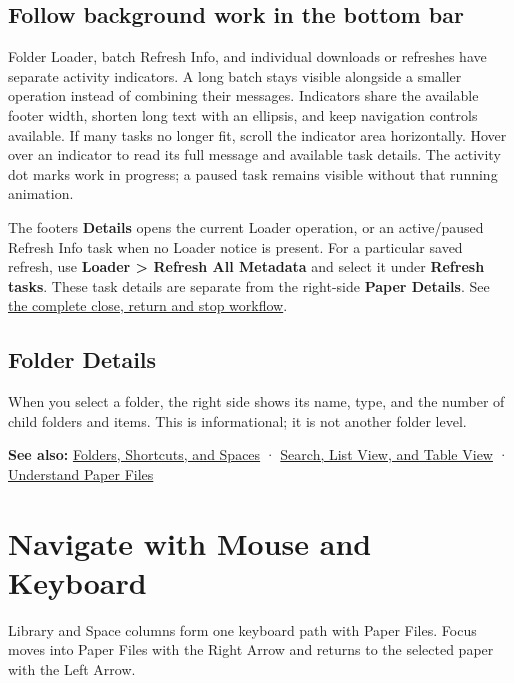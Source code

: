 \documentclass[10pt,letterpaper,oneside]{scrreprt}
\newenvironment{GewuRelated}{\par\nobreak\vspace{3pt}\nobreak\begingroup\small\sffamily\begin{samepage}\noindent}{\par\end{samepage}\endgroup}
\newenvironment{GewuLead}
  {\begin{list}{}{\leftmargin=0pt\rightmargin=0pt\topsep=0pt\partopsep=0pt\parsep=0pt}\item\relax
    \sffamily\fontsize{10.5}{13.2}\selectfont\color{GewuMuted}}
  {\end{list}}
\begin{document}
\subsection{Follow background work in the bottom bar}\label{follow-background-work-in-the-bottom-bar}

Folder Loader, batch Refresh Info, and individual downloads or refreshes have separate activity indicators. A long batch stays visible alongside a smaller operation instead of combining their messages. Indicators share the available footer width, shorten long text with an ellipsis, and keep navigation controls available. If many tasks no longer fit, scroll the indicator area horizontally. Hover over an indicator to read its full message and available task details. The activity dot marks work in progress; a paused task remains visible without that running animation.

The footer\textquotesingle s \textbf{Details} opens the current Loader operation, or an active/paused Refresh Info task when no Loader notice is present. For a particular saved refresh, use \textbf{Loader \textgreater{} Refresh All Metadata} and select it under \textbf{Refresh tasks}. These task details are separate from the right-side \textbf{Paper Details}. See \hyperref[loader-maintenance]{the complete close, return and stop workflow}.

\subsection{Folder Details}\label{folder-details}

When you select a folder, the right side shows its name, type, and the number of child folders and items. This is informational; it is not another folder level.

\begin{GewuRelated}
\textbf{See also:} \hyperref[organize]{Folders, Shortcuts, and Spaces} · \hyperref[search-views]{Search, List View, and Table View} · \hyperref[paper-files]{Understand Paper Files}
\end{GewuRelated}

\section{Navigate with Mouse and Keyboard}\label{navigation}

\begin{GewuLead}
Library and Space columns form one keyboard path with Paper Files. Focus moves into Paper Files with the Right Arrow and returns to the selected paper with the Left Arrow.
\end{GewuLead}
\end{document}
